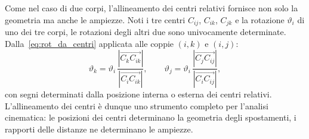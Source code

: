 \begin{oss}
	Come nel caso di due corpi, l'allineamento dei centri relativi fornisce non
	solo la geometria ma anche le ampiezze. Noti i tre centri $C_{ij}$, $C_{ik}$,
	$C_{jk}$ e la rotazione $\vartheta_i$ di uno dei tre corpi, le rotazioni degli
	altri due sono univocamente determinate. Dalla~\eqref{eq:rot_da_centri}
	applicata alle coppie $(i,k)$ e $(i,j)$:
	\begin{equation}
		\vartheta_k = \vartheta_i\,
		\frac{|\overrightarrow{C_k C_{ik}}|}
		{|\overrightarrow{C_i C_{ik}}|}, \qquad
		\vartheta_j = \vartheta_i\,
		\frac{|\overrightarrow{C_j C_{ij}}|}
		{|\overrightarrow{C_i C_{ij}}|},
	\end{equation}
	con segni determinati dalla posizione interna o esterna dei centri relativi.
	L'allineamento dei centri è dunque uno strumento completo per l'analisi
	cinematica: le posizioni dei centri determinano la geometria degli spostamenti,
	i rapporti delle distanze ne determinano le ampiezze.
\end{oss}


	
	
